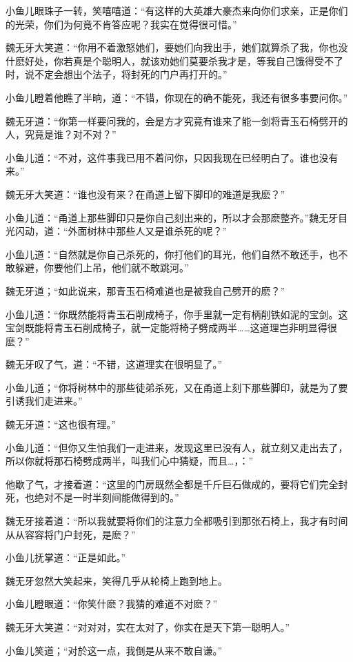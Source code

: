 \documentclass[12pt,oneside]{book}
\begin{document}
小鱼儿眼珠子一转，笑嘻嘻道：``有这样的大英雄大豪杰来向你们求亲，正是你们的光荣，你们为何竟不肯答应呢？我实在觉得很可惜。''

魏无牙大笑道：``你用不着激怒她们，要她们向我出手，她们就算杀了我，你也没什麽好处，你若真是个聪明人，就该劝她们莫要杀我才是，等我自己饿得受不了时，说不定会想出个法子，将封死的门户再打开的。''

小鱼儿瞪着他瞧了半晌，道：``不错，你现在的确不能死，我还有很多事要问你。''

魏无牙道：``你第一样要问我的，会是方才究竟有谁来了能一剑将青玉石椅劈开的人，究竟是谁？对不对？''

小鱼儿道：``不对，这件事我已用不着问你，只因我现在已经明白了。谁也没有来。''

魏无牙大笑道：``谁也没有来？在甬道上留下脚印的难道是我麽？''

小鱼儿道：``甬道上那些脚印只是你自己刻出来的，所以才会那麽整齐。''魏无牙目光闪动，道：``外面树林中那些人又是谁杀死的呢？''

小鱼儿道：``自然就是你自己杀死的，你打他们的耳光，他们自然不敢还手，也不敢躲避，你要他们上吊，他们就不敢跳河。''

魏无牙道；``如此说来，那青玉石椅难道也是被我自己劈开的麽？''

小鱼儿道：``你既然能将青玉石削成椅子，你手里就一定有柄削铁如泥的宝剑。这宝剑既能将青玉石削成椅子，就一定能将椅子劈成两半\ldots\ldots 这道理岂非明显得很麽？''

魏无牙叹了气，道：``不错，这道理实在很明显了。''

小鱼儿道；``你将树林中的那些徒弟杀死，又在甬道上刻下那些脚印，就是为了要引诱我们走进来。''

魏无牙道：``这也很有理。''

小鱼儿道：``但你又生怕我们一走进来，发现这里已没有人，就立刻又走出去了，所以你就将那石椅劈成两半，叫我们心中猜疑，而且\ldots，：''

他歇了气，才接着道：``这里的门房既然全都是千斤巨石做成的，要将它们完全封死，也绝对不是一时半刻间能做得到的。''

魏无牙接着道：``所以我就要将你们的注意力全都吸引到那张石椅上，我才有时间从从容容将门户封死，是麽？''

小鱼儿抚掌道：``正是如此。''

魏无牙忽然大笑起来，笑得几乎从轮椅上跑到地上。

小鱼儿瞪眼道：``你笑什麽？我猜的难道不对麽？''

魏无牙大笑道：``对对对，实在太对了，你实在是天下第一聪明人。''

小鱼儿笑道；``对於这一点，我倒是从来不敢自谦。''
\end{document}
